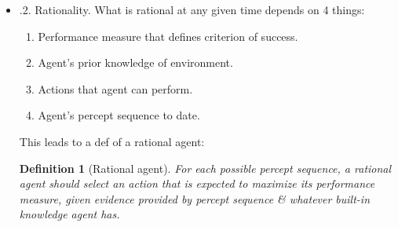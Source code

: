\documentclass{article}
\newtheorem{definition}{Definition}
\begin{document}
\begin{itemize}
\begin{itemize}
\begin{itemize}
\begin{itemize}
				For most of book, assume: performance measure can be specified correctly. For reasons given above, however, must accept possibility that we might put wrong purpose into machine -- precisely King Midas problem described on p. 51. Moreover, when designing 1 piece of software, copies of which will belong to different users, cannot anticipate exact preferences of each individual user. Thus, may need to build agents that reflect initial uncertainty about true performance measure \& learn more about it as time goes by; such agents are described in Chaps. 15, 17, 23.
				\item {.2. Rationality.} What is rational at any given time depends on 4 things:
				\begin{enumerate}
					\item Performance measure that defines criterion of success.
					\item Agent's prior knowledge of environment.
					\item Actions that agent can perform.
					\item Agent's percept sequence to date.
				\end{enumerate}
				This leads to a def of a rational agent:
				\begin{definition}[Rational agent]
					For each possible percept sequence, a {\rm rational agent} should select an action that is expected to maximize its performance measure, given evidence provided by percept sequence \& whatever built-in knowledge agent has.
					

\end{definition}
\end{itemize}
\end{itemize}
\end{itemize}
\end{itemize}
\end{document}
